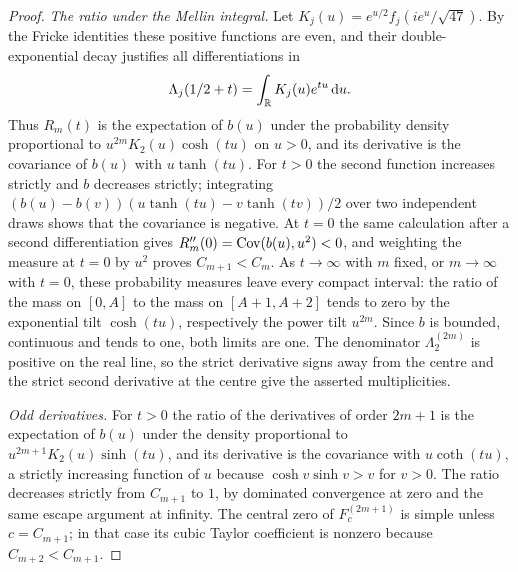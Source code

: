 \begin{proof}
\emph{The ratio under the Mellin integral.}
Let $K_j(u)=e^{u/2}f_j(ie^u/\sqrt{47})$. By the Fricke identities these positive functions are even, and
their double-exponential decay justifies all differentiations in
\[
 \Lambda_j(1/2+t)=\int_{\mathbb{R}} K_j(u)e^{tu}\,\mathrm{d} u .
\]
Thus $R_m(t)$ is the expectation of $b(u)$ under the probability density proportional to
$u^{2m}K_2(u)\cosh(tu)$ on $u>0$, and its derivative is the covariance of $b(u)$ with $u\tanh(tu)$. For
$t>0$ the second function increases strictly and $b$ decreases strictly; integrating
$(b(u)-b(v))(u\tanh(tu)-v\tanh(tv))/2$ over two independent draws shows that the covariance is negative.
At $t=0$ the same calculation after a second differentiation gives $R_m''(0)=\operatorname{Cov}(b(u),u^2)<0$, and
weighting the measure at $t=0$ by $u^2$ proves $C_{m+1}<C_m$. As $t\to\infty$ with $m$ fixed, or
$m\to\infty$ with $t=0$, these probability measures leave every compact interval: the ratio of the mass on
$[0,A]$ to the mass on $[A+1,A+2]$ tends to zero by the exponential tilt $\cosh(tu)$, respectively the
power tilt $u^{2m}$. Since $b$ is bounded, continuous and tends to one, both limits are one. The denominator
$\Lambda_2^{(2m)}$ is positive on the real line, so the strict derivative signs away from the centre and the
strict second derivative at the centre give the asserted multiplicities.

\emph{Odd derivatives.}
For $t>0$ the ratio of the derivatives of order $2m+1$ is the expectation of $b(u)$ under the density
proportional to $u^{2m+1}K_2(u)\sinh(tu)$, and its derivative is the covariance with $u\coth(tu)$, a
strictly increasing function of $u$ because $\cosh v\sinh v>v$ for $v>0$. The ratio decreases strictly from
$C_{m+1}$ to $1$, by dominated convergence at zero and the same escape argument at infinity. The central
zero of $F_c^{(2m+1)}$ is simple unless $c=C_{m+1}$; in that case its cubic Taylor coefficient is nonzero
because $C_{m+2}<C_{m+1}$.
\end{proof}

